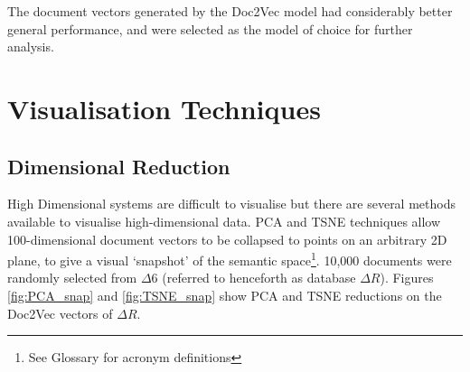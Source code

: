The document vectors generated by the Doc2Vec model had considerably better general performance, and were selected as the model of choice for further analysis.  
\section{Visualisation Techniques}
\subsection{Dimensional Reduction}
High Dimensional systems are difficult to visualise but there are several methods available to visualise high-dimensional data. PCA \cite{PCA} and TSNE \cite{tsne1}\cite{bhtsne} techniques allow 100-dimensional document vectors to be collapsed to points on an arbitrary 2D plane, to give a visual `snapshot' of the semantic space\footnote{See Glossary for acronym definitions}. 
10,000 documents were randomly selected from $\Delta6$ (referred to henceforth as database $\Delta R$).
Figures \ref{fig:PCA_snap} and \ref{fig:TSNE_snap} show PCA and TSNE reductions on the Doc2Vec vectors of $\Delta R$\cite{scikitlearn}.

